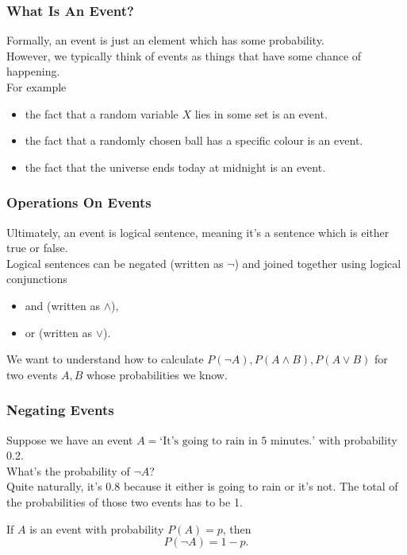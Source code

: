 \documentclass[aspectratio=169,11pt,usenames,dvipsnames]{beamer}
\begin{document}
\begin{frame}
 \frametitle{What Is An Event?}
 Formally, an \alert{event} is just an element which \alert{has some
 probability}.\\
 However, we typically think of events as \alert{things that have some chance of
 happening}.\\
 For example
 \begin{itemize}
  \item the fact that a random variable $X$ lies in some set is an event.
  \pause
  \item the fact that a randomly chosen ball has a specific colour is an event.
  \pause
  \item the fact that the universe ends today at midnight is an event.
 \end{itemize}
\end{frame}

\begin{frame}
 \frametitle{Operations On Events}
 Ultimately, an event is \alert{logical sentence}, meaning it's a sentence which
 is either \alert{true} or \alert{false}.\pause\\
 Logical sentences can be negated (written as $\neg $) and joined together using
 logical conjunctions\pause\\
 \begin{itemize}
  \item \alert{and} (written as $ \wedge $),
  \pause
  \item \alert{or} (written as $ \vee $).
 \end{itemize}
 \pause
 We want to understand how to calculate $P(\neg A),P(A \wedge B),P(A \vee B)$
 for two events $A,B$ whose probabilities we know.
\end{frame}

\begin{frame}
 \frametitle{Negating Events}
 Suppose we have an event $A = \text{`It's going to rain in 5 minutes.'}$ with
 probability 0.2.\pause\\
 What's the probability of $\neg A$?\pause\\
 Quite naturally, it's 0.8 because it either is going to rain or it's not. The
 total of the probabilities of those two events has to be 1.\pause
 \begin{tcolorbox}[title=Negation Formula]
  If $A$ is an event with probability $P(A) = p$, then
  \[
   P(\neg A) = 1 - p.
  \]
 \end{tcolorbox}
\end{frame}
\end{document}

